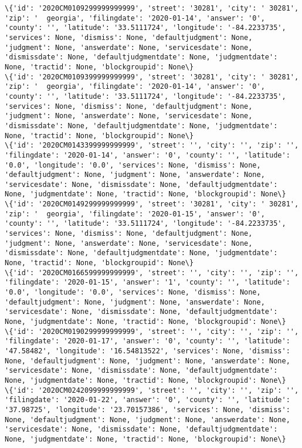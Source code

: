 \documentclass[11pt]{article}
\begin{document}
\begin{Verbatim}[commandchars=\\\{\}]
\{'id': '2020CM0109299999999999', 'street': '30281', 'city': ' 30281', 'zip': '  georgia', 'filingdate': '2020-01-14', 'answer': '0', 'county': '', 'latitude': '33.5111724', 'longitude': '-84.2233735', 'services': None, 'dismiss': None, 'defaultjudgment': None, 'judgment': None, 'answerdate': None, 'servicesdate': None, 'dismissdate': None, 'defaultjudgmentdate': None, 'judgmentdate': None, 'tractid': None, 'blockgroupid': None\}
\{'id': '2020CM0109399999999999', 'street': '30281', 'city': ' 30281', 'zip': '  georgia', 'filingdate': '2020-01-14', 'answer': '0', 'county': '', 'latitude': '33.5111724', 'longitude': '-84.2233735', 'services': None, 'dismiss': None, 'defaultjudgment': None, 'judgment': None, 'answerdate': None, 'servicesdate': None, 'dismissdate': None, 'defaultjudgmentdate': None, 'judgmentdate': None, 'tractid': None, 'blockgroupid': None\}
\{'id': '2020CM0143399999999999', 'street': '', 'city': '', 'zip': '', 'filingdate': '2020-01-14', 'answer': '0', 'county': '', 'latitude': '0.0', 'longitude': '0.0', 'services': None, 'dismiss': None, 'defaultjudgment': None, 'judgment': None, 'answerdate': None, 'servicesdate': None, 'dismissdate': None, 'defaultjudgmentdate': None, 'judgmentdate': None, 'tractid': None, 'blockgroupid': None\}
\{'id': '2020CM0149299999999999', 'street': '30281', 'city': ' 30281', 'zip': '  georgia', 'filingdate': '2020-01-15', 'answer': '0', 'county': '', 'latitude': '33.5111724', 'longitude': '-84.2233735', 'services': None, 'dismiss': None, 'defaultjudgment': None, 'judgment': None, 'answerdate': None, 'servicesdate': None, 'dismissdate': None, 'defaultjudgmentdate': None, 'judgmentdate': None, 'tractid': None, 'blockgroupid': None\}
\{'id': '2020CM0166599999999999', 'street': '', 'city': '', 'zip': '', 'filingdate': '2020-01-15', 'answer': '1', 'county': '', 'latitude': '0.0', 'longitude': '0.0', 'services': None, 'dismiss': None, 'defaultjudgment': None, 'judgment': None, 'answerdate': None, 'servicesdate': None, 'dismissdate': None, 'defaultjudgmentdate': None, 'judgmentdate': None, 'tractid': None, 'blockgroupid': None\}
\{'id': '2020CM0190299999999999', 'street': '', 'city': '', 'zip': '', 'filingdate': '2020-01-17', 'answer': '0', 'county': '', 'latitude': '47.58482', 'longitude': '16.54813522', 'services': None, 'dismiss': None, 'defaultjudgment': None, 'judgment': None, 'answerdate': None, 'servicesdate': None, 'dismissdate': None, 'defaultjudgmentdate': None, 'judgmentdate': None, 'tractid': None, 'blockgroupid': None\}
\{'id': '2020CM0242099999999999', 'street': '', 'city': '', 'zip': '', 'filingdate': '2020-01-22', 'answer': '0', 'county': '', 'latitude': '37.98725', 'longitude': '23.70157386', 'services': None, 'dismiss': None, 'defaultjudgment': None, 'judgment': None, 'answerdate': None, 'servicesdate': None, 'dismissdate': None, 'defaultjudgmentdate': None, 'judgmentdate': None, 'tractid': None, 'blockgroupid': None\}

\end{Verbatim}
\end{document}
